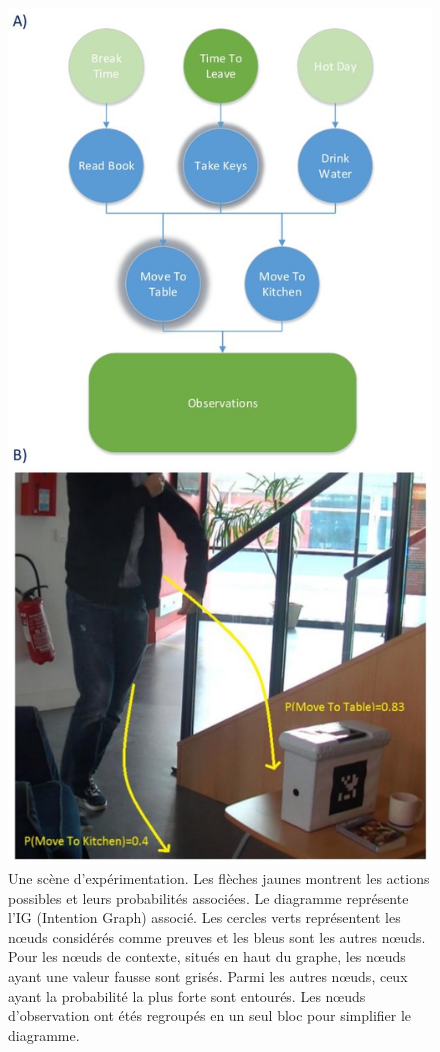 \documentclass[a4paper,11pt,twoside]{StyleThese}
\begin{document}


\vspace{-10pt}

 \begin{figure}[h!]
	\centering
	\includegraphics[width=0.63\linewidth]{intention/cookieScenario.jpg}
	\caption{Une scène d'expérimentation. Les flèches jaunes montrent les actions possibles et leurs probabilités associées. Le diagramme représente l'IG (Intention Graph) associé. Les cercles verts représentent les nœuds considérés comme preuves et les bleus sont les autres nœuds. Pour les nœuds de contexte, situés en haut du graphe, les nœuds ayant une valeur fausse sont grisés. Parmi les autres nœuds, ceux ayant la probabilité la plus forte sont entourés. Les nœuds d'observation ont étés regroupés en un seul bloc pour simplifier le diagramme.}
	\label{fig:intention_graph}
   	\vspace{-20pt}
\end{figure}
\end{document}

